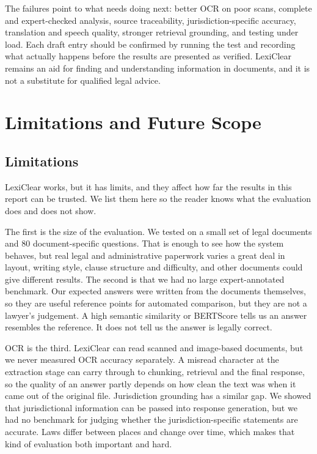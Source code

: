 \documentclass[12pt,a4paper,oneside]{report}
\begin{document}
The failures point to what needs doing next: better OCR on poor scans, complete and expert-checked analysis, source traceability, jurisdiction-specific accuracy, translation and speech quality, stronger retrieval grounding, and testing under load. Each draft entry should be confirmed by running the test and recording what actually happens before the results are presented as verified. LexiClear remains an aid for finding and understanding information in documents, and it is not a substitute for qualified legal advice.


\chapter{Limitations and Future Scope}

\section{Limitations}
LexiClear works, but it has limits, and they affect how far the results in this report can be trusted. We list them here so the reader knows what the evaluation does and does not show.

The first is the size of the evaluation. We tested on a small set of legal documents and 80 document-specific questions. That is enough to see how the system behaves, but real legal and administrative paperwork varies a great deal in layout, writing style, clause structure and difficulty, and other documents could give different results. The second is that we had no large expert-annotated benchmark. Our expected answers were written from the documents themselves, so they are useful reference points for automated comparison, but they are not a lawyer's judgement. A high semantic similarity or BERTScore tells us an answer resembles the reference. It does not tell us the answer is legally correct.

OCR is the third. LexiClear can read scanned and image-based documents, but we never measured OCR accuracy separately. A misread character at the extraction stage can carry through to chunking, retrieval and the final response, so the quality of an answer partly depends on how clean the text was when it came out of the original file. Jurisdiction grounding has a similar gap. We showed that jurisdictional information can be passed into response generation, but we had no benchmark for judging whether the jurisdiction-specific statements are accurate. Laws differ between places and change over time, which makes that kind of evaluation both important and hard.
\end{document}
